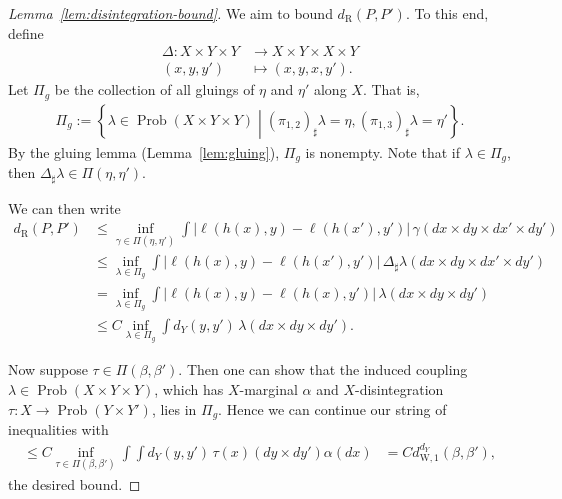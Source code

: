 \documentclass[twoside,11pt]{article}
\DeclareMathOperator{\prob}{Prob}
\newcommand{\dexp}[1][]{d_{\mathrm{R}#1}}
\newcommand{\set}[2]{\left\{ #1\middle| #2\right\}}
\newcommand{\dWkernp}[1]{d_{\mathrm{W},#1}}
\newcommand{\dWkern}{\dWkernp{1}}
\begin{document}
    
\begin{proof}[Lemma~\ref{lem:disintegration-bound}]
    We aim to bound $\dexp(P,P')$. To this end, define 
    \begin{align*}
        \Delta:X\times Y \times Y &\to X\times Y \times X \times Y
        \\
        (x,y,y')  & \mapsto (x,y,x,y').
    \end{align*}
    Let $\Pi_g$ be the collection of all gluings of $\eta$ and $\eta'$ along $X$. That is,
    \begin{align*}
        \Pi_g := \set{\lambda \in \prob(X\times Y \times Y)}{(\pi_{1,2})_\sharp \lambda = \eta,(\pi_{1,3})_\sharp \lambda = \eta'}.
    \end{align*}
    By the gluing lemma (Lemma~\ref{lem:gluing}), $\Pi_g$ is nonempty.
    Note that if $\lambda\in \Pi_g$, then $\Delta_\sharp \lambda \in \Pi(\eta,\eta')$.

    We can then write
    \begin{align*}
        \dexp(P,P')
        &
        \leq \inf_{\gamma\in \Pi(\eta,\eta')} \int \big| \ell(h(x),y) - \ell(h(x'),y') \big| \, \gamma(dx\times dy\times dx'\times dy')
        \\ &
        \leq \inf_{\lambda \in \Pi_g} \int \big| \ell(h(x),y) - \ell(h(x'),y') \big| \, \Delta_\sharp \lambda(dx\times dy\times dx'\times dy')
        \\ &
        = \inf_{\lambda \in \Pi_g} \int \big| \ell(h(x),y) - \ell(h(x),y') \big| \, \lambda(dx\times dy\times dy')
        \\ &
        \leq C\inf_{\lambda \in \Pi_g} \int d_Y(y,y') \, \lambda(dx\times dy\times dy').
    \end{align*}

    Now suppose $\tau \in \Pi(\beta,\beta')$. Then one can show that the induced coupling $\lambda \in \prob(X\times Y \times Y)$, which has $X$-marginal $\alpha$ and $X$-disintegration $\tau:X\to \prob(Y\times Y')$, lies in $\Pi_g$. Hence we can continue our string of inequalities with
    \begin{align*}
        \leq C\inf_{\tau \in \Pi(\beta,\beta')} \int\int d_Y(y,y') \, \tau(x)(dy\times dy')\alpha(dx)
        & =
        C \dWkern^{d_Y}(\beta,\beta'),
    \end{align*}
    the desired bound.
\end{proof}
\end{document}
